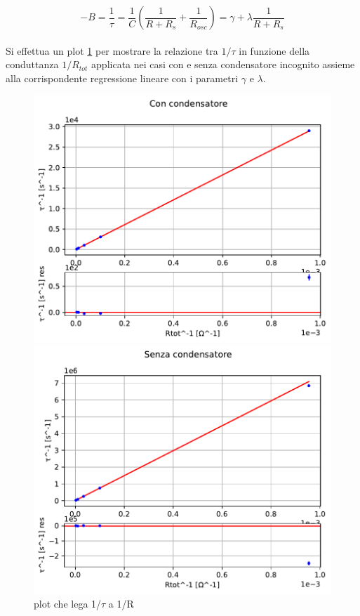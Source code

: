 \documentclass{article}
\begin{document}
\begin{equation}
	-B=\frac{1}{\tau}=\frac{1}{C} \left( \frac{1}{R+R_s} + \frac{1}{R_{osc}} \right) = \gamma + \lambda \frac{1}{R+R_s}
\end{equation}
\\
Si effettua un plot \ref{fig:fit1} per mostrare la relazione tra $1/\tau$ in funzione della conduttanza $1/R_{tot}$ applicata nei casi con e senza condensatore incognito assieme alla corrispondente regressione lineare con i parametri $\gamma$ e $\lambda$.

\begin{figure}[h]
	\centering
	 \begin{minipage}{0.5\textwidth}
	     \centering
	     \includegraphics[width=\textwidth]{figfit.pdf}
	 \end{minipage}\hfill
	 \begin{minipage}{0.5\textwidth}
	     \centering
	     \includegraphics[width=\textwidth]{figfit1.pdf} 
	 \end{minipage}
	 \caption{plot che lega 1/$\tau$ a 1/R}
	 \label{fig:fit1}
\end{figure}
\end{document}
